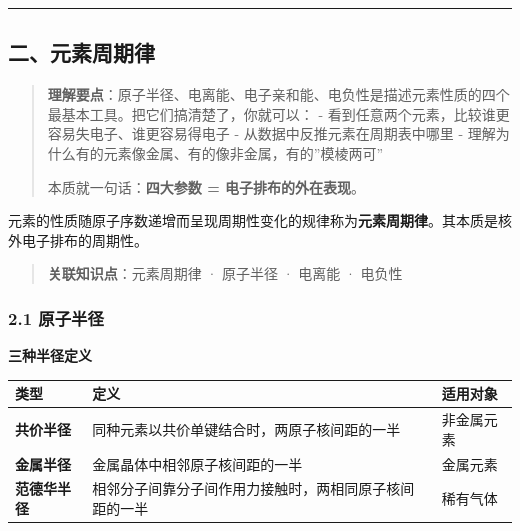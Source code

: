 \begin{center}\rule{0.5\linewidth}{0.5pt}\end{center}

\subsection{二、元素周期律}\label{ux4e8cux5143ux7d20ux5468ux671fux5f8b}

\begin{quote}
\textbf{理解要点}：原子半径、电离能、电子亲和能、电负性是描述元素性质的四个最基本工具。把它们搞清楚了，你就可以：
- 看到任意两个元素，比较谁更容易失电子、谁更容易得电子
- 从数据中反推元素在周期表中哪里
- 理解为什么有的元素像金属、有的像非金属，有的''模棱两可''

本质就一句话：\textbf{四大参数 = 电子排布的外在表现}。
\end{quote}

元素的性质随原子序数递增而呈现周期性变化的规律称为\textbf{元素周期律}。其本质是核外电子排布的周期性。

\begin{quote}
\textbf{关联知识点}：元素周期律 · 原子半径 · 电离能 · 电负性
\end{quote}

\subsubsection{2.1 原子半径}\label{ux539fux5b50ux534aux5f84}

\textbf{三种半径定义}

{\def\LTcaptype{none} %
\begin{longtable}[]{@{}
  >{\raggedright\arraybackslash}p{}
  >{\raggedright\arraybackslash}p{}
  >{\raggedright\arraybackslash}p{}@{}}
\toprule\noalign{}
\begin{minipage}[b]{\linewidth}\raggedright
类型
\end{minipage} & \begin{minipage}[b]{\linewidth}\raggedright
定义
\end{minipage} & \begin{minipage}[b]{\linewidth}\raggedright
适用对象
\end{minipage} \\
\midrule\noalign{}
\endhead
\bottomrule\noalign{}
\endlastfoot
\textbf{共价半径} & 同种元素以共价单键结合时，两原子核间距的一半 & 非金属元素 \\
\textbf{金属半径} & 金属晶体中相邻原子核间距的一半 & 金属元素 \\
\textbf{范德华半径} & 相邻分子间靠分子间作用力接触时，两相同原子核间距的一半 & 稀有气体 \\
\end{longtable}
}

